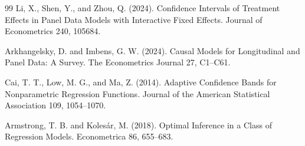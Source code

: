 \documentclass{article}
\begin{document}
\begin{thebibliography}{99}
   Li, X., Shen, Y., and Zhou, Q. (2024). Confidence Intervals of Treatment Effects in Panel Data Models with Interactive Fixed Effects. Journal of Econometrics 240, 105684.

   Arkhangelsky, D. and Imbens, G. W. (2024). Causal Models for Longitudinal and Panel Data: A Survey. The Econometrics Journal 27, C1--C61.

   Cai, T. T., Low, M. G., and Ma, Z. (2014). Adaptive Confidence Bands for Nonparametric Regression Functions. Journal of the American Statistical Association 109, 1054--1070.

   Armstrong, T. B. and Koles\'{a}r, M. (2018). Optimal Inference in a Class of Regression Models. Econometrica 86, 655--683.

\end{thebibliography}
\end{document}
